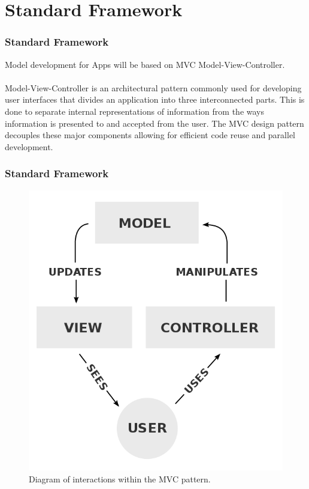 \documentclass{beamer}
\begin{document}
\section{Standard Framework}

\begin{frame}
\frametitle{Standard Framework}

Model development for Apps will be based on MVC Model-View-Controller. \\~\\
Model-View-Controller is an architectural pattern commonly used for developing user interfaces that divides an application into three interconnected parts. This is done to separate internal representations of information from the ways information is presented to and accepted from the user. The MVC design pattern decouples these major components allowing for efficient code reuse and parallel development.

\end{frame}

\begin{frame}
\frametitle{Standard Framework}

\begin{figure}
    \includegraphics[width=0.7\columnwidth]{images/MVC-Process.png}
    \caption{Diagram of interactions within the MVC pattern.}
\end{figure}

\end{frame}
\end{document}

